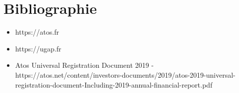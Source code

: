 \documentclass[12pt]{article}
\begin{document}
\begin {sloppypar}
\section{Bibliographie}
\begin{itemize}
  \item 
    https://atos.fr
  \item 
    https://ugap.fr 
  \item 
    Atos Universal Registration Document 2019 - https://atos.net/content/investors-documents/2019/atos-2019-universal-registration-document-Including-2019-annual-financial-report.pdf
\end{itemize}
\end{sloppypar}
\end{document}
